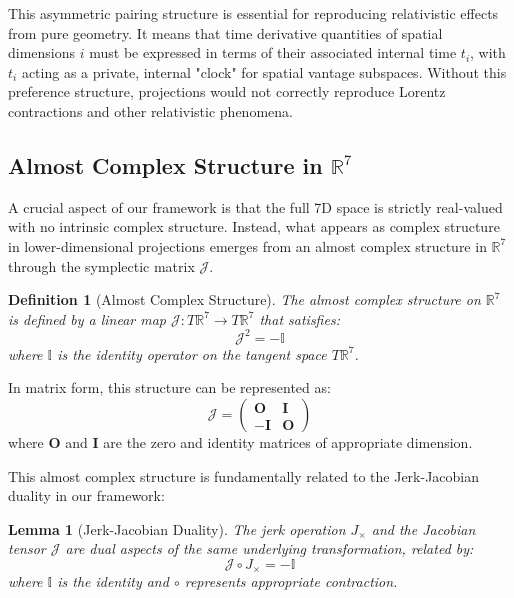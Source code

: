 \documentclass{article}
\newtheorem{lemma}{Lemma}
\newtheorem{definition}{Definition}
\begin{document}
This asymmetric pairing structure is essential for reproducing relativistic effects from pure geometry. It means that time derivative quantities of spatial dimensions $i$ must be expressed in terms of their associated internal time $t_i$, with $t_i$ acting as a private, internal "clock" for spatial vantage subspaces. Without this preference structure, projections would not correctly reproduce Lorentz contractions and other relativistic phenomena.

\subsection{Almost Complex Structure in $\mathbb{R}^7$}

A crucial aspect of our framework is that the full 7D space is strictly real-valued with no intrinsic complex structure. Instead, what appears as complex structure in lower-dimensional projections emerges from an almost complex structure in $\mathbb{R}^7$ through the symplectic matrix $\mathcal{J}$.

\begin{definition}[Almost Complex Structure]
The almost complex structure on $\mathbb{R}^7$ is defined by a linear map $\mathcal{J}: T\mathbb{R}^7 \rightarrow T\mathbb{R}^7$ that satisfies:
\begin{equation}
\mathcal{J}^2 = -\mathbb{I}
\end{equation}
where $\mathbb{I}$ is the identity operator on the tangent space $T\mathbb{R}^7$.
\end{definition}

In matrix form, this structure can be represented as:
\begin{equation}
\mathcal{J} = \begin{pmatrix}
\mathbf{O} & \mathbf{I} \\
-\mathbf{I} & \mathbf{O}
\end{pmatrix}
\end{equation}
where $\mathbf{O}$ and $\mathbf{I}$ are the zero and identity matrices of appropriate dimension.

This almost complex structure is fundamentally related to the Jerk-Jacobian duality in our framework:

\begin{lemma}[Jerk-Jacobian Duality]
The jerk operation $J_{\times}$ and the Jacobian tensor $\mathcal{J}$ are dual aspects of the same underlying transformation, related by:
\begin{equation}
\mathcal{J} \circ J_{\times} = -\mathbb{I}
\end{equation}
where $\mathbb{I}$ is the identity and $\circ$ represents appropriate contraction.
\end{lemma}
\end{document}
